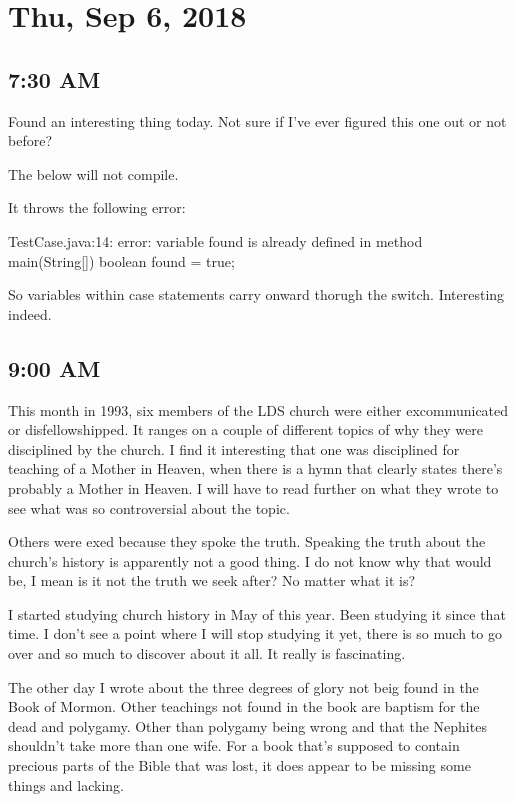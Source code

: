 \section{Thu, Sep 6, 2018}

\subsection{7:30 AM}

Found an interesting thing today. Not sure if I've ever figured this one out or not
before?

The below will not compile.



It throws the following error:

\begin{displayquote}
TestCase.java:14: error: variable found is already defined in method main(String[])
        boolean found = true;
\end{displayquote}

So variables within case statements carry onward thorugh the switch. Interesting
indeed.

\subsection{9:00 AM}

This month in 1993, six members of the LDS church were either excommunicated or
disfellowshipped. It ranges on a couple of different topics of why they were
disciplined by the church. I find it interesting that one was disciplined for
teaching of a Mother in Heaven, when there is a hymn that clearly states there's
probably a Mother in Heaven. I will have to read further on what they wrote to see
what was so controversial about the topic.

Others were exed because they spoke the truth. Speaking the truth about the church's
history is apparently not a good thing. I do not know why that would be, I mean is it
not the truth we seek after? No matter what it is?

I started studying church history in May of this year. Been studying it since that
time. I don't see a point where I will stop studying it yet, there is so much to go
over and so much to discover about it all. It really is fascinating.

The other day I wrote about the three degrees of glory not beig found in the Book of
Mormon. Other teachings not found in the book are baptism for the dead and polygamy.
Other than polygamy being wrong and that the Nephites shouldn't take more than one
wife. For a book that's supposed to contain precious parts of the Bible that was
lost, it does appear to be missing some things and lacking.


